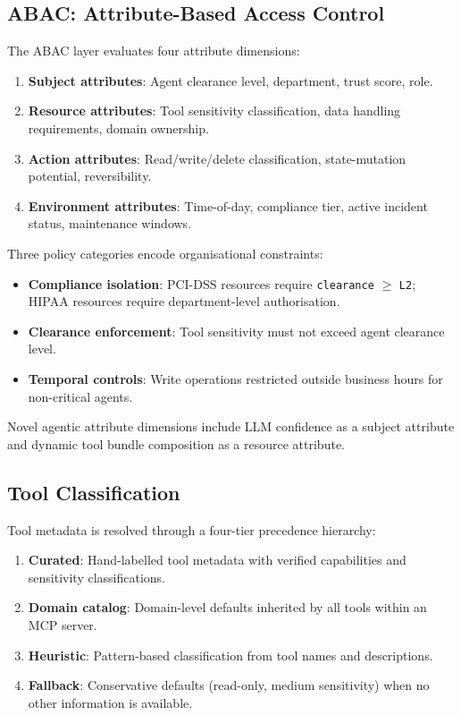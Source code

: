 \documentclass[10pt,a4paper,twocolumn]{article}
\begin{document}
\subsection{ABAC: Attribute-Based Access Control}
\label{sec:abac_layer}

The ABAC layer evaluates four attribute dimensions:

\begin{enumerate}
  \item \textbf{Subject attributes}: Agent clearance level, department, trust score, role.
  \item \textbf{Resource attributes}: Tool sensitivity classification, data handling requirements, domain ownership.
  \item \textbf{Action attributes}: Read/write/delete classification, state-mutation potential, reversibility.
  \item \textbf{Environment attributes}: Time-of-day, compliance tier, active incident status, maintenance windows.
\end{enumerate}

Three policy categories encode organisational constraints:

\begin{itemize}
  \item \textbf{Compliance isolation}: PCI-DSS resources require \texttt{clearance} $\geq$ \texttt{L2}; HIPAA resources require department-level authorisation.
  \item \textbf{Clearance enforcement}: Tool sensitivity must not exceed agent clearance level.
  \item \textbf{Temporal controls}: Write operations restricted outside business hours for non-critical agents.
\end{itemize}

Novel agentic attribute dimensions include LLM confidence as a subject attribute and dynamic tool bundle composition as a resource attribute.

\subsection{Tool Classification}
\label{sec:tool_classification}

Tool metadata is resolved through a four-tier precedence hierarchy:
\begin{enumerate}
  \item \textbf{Curated}: Hand-labelled tool metadata with verified capabilities and sensitivity classifications.
  \item \textbf{Domain catalog}: Domain-level defaults inherited by all tools within an MCP server.
  \item \textbf{Heuristic}: Pattern-based classification from tool names and descriptions.
  \item \textbf{Fallback}: Conservative defaults (read-only, medium sensitivity) when no other information is available.
\end{enumerate}
\end{document}
